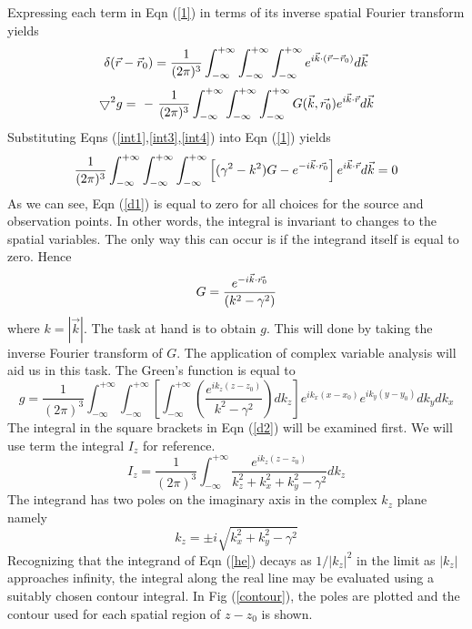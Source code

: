 Expressing each term in Eqn (\ref{1}) in terms of its inverse spatial Fourier transform yields
\begin{equation}
\label{int3}
\delta({\vec{r} -\vec{r}_0})= \frac {1}{(2\pi)^3}\int_{-\infty}^{+\infty} \int_{-\infty}^{+\infty} \int_{-\infty}^{+\infty} 
e^{i{\vec {k}\cdot({\vec{r} - \vec{r}_0}})}  d\vec {k}              
\end{equation}
\begin{equation}
\label{int4}
\bigtriangledown^2 g=  ~-~\frac{1}{(2\pi)^3}\int_{-\infty}^{+\infty} \int_{-\infty}^{+\infty} \int_{-\infty}^{+\infty} G({\vec {k}},\vec{r_{0}})
e^{i{\vec {k}\cdot\vec{r}}} d\vec {k}
\end{equation}
Substituting Eqns (\ref{int1},\ref{int3},\ref{int4}) into Eqn (\ref{1}) yields
%
\begin{equation}
\label{d1}
\frac{1}{(2\pi)^3}\int_{-\infty}^{+\infty} \int_{-\infty}^{+\infty} \int_{-\infty}^{+\infty} 
\left [{ (\gamma^2 -k^2) G - e^{-i{\vec {k}\cdot \vec{r_0}}} }\right ]
e^{i{\vec {k}\cdot\vec{r} }} 
{d\vec {k}}
 =0
\end{equation}
As we can see,  Eqn (\ref{d1}) is equal to zero for all choices for the
source and observation points. In other words, the integral is invariant
to changes to the spatial variables. The only way this can occur is if 
the integrand itself is  equal to zero. Hence
\begin{equation}
 G= \frac{e^{-i{\vec {k} \cdot \vec{ r_0}}}}{( k^2 -\gamma^2)} 
\end{equation}
where $k=|\vec{k}|$. The task at hand is to obtain $g$. This will done by taking the inverse Fourier
transform of $G$. The application of complex variable analysis
will aid us in this task. The Green's function is equal to
%
\begin{equation}
\label{d2}
 g=
\frac{1}{(2\pi)^3}\int_{-\infty}^{+\infty} \int_{-\infty}^{+\infty}
 {
\left[\int_{-\infty}^{+\infty} 
\left( \frac{e^{ i { k_z (z - z_0)}}}{ k^2 -\gamma^2} \right )dk_z \right] e^{ i { k_x (x - x_0)}}e^{ i { k_y (y - y_0)}} 
}
dk_y dk_x             
\end{equation}
%
The integral in the square brackets in Eqn (\ref{d2}) will be examined first.
We will use term the integral $I_z$ for reference.
\begin{equation}
\label{he}
 I_z=\frac{1}{(2\pi)^3}\int_{-\infty}^{+\infty} \frac{e^ { ik_z(z-z_0)}}{k_z^2+k_x^2+k_y^2 - \gamma^2} dk_z       
\end{equation}
The integrand has two poles on the imaginary axis in the complex $k_z$ plane namely 
%
\begin{equation}
k_z=\pm i\sqrt{k_x^2 + k_y^2 - \gamma^2}
\end{equation}
%
Recognizing that  the integrand of Eqn (\ref{he}) 
decays as $1/|k_z|^2$ in the limit  as $|k_z|$ approaches infinity,
the integral along the real line may be evaluated using a suitably 
chosen contour integral.
In Fig (\ref{contour}), the poles are plotted and the contour used for each spatial
region of $z - z_0$ is shown.


